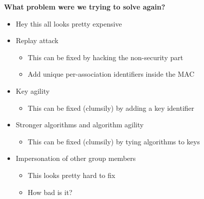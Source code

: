 \documentclass[helvetica]{seminar}
\newcommand{\heading}[1]{%
  \begin{center} 
    \large\bf 
    #1 
  \end{center} 
  \vspace{.4 in}}
\begin{document}
\begin{slide}
\heading{What problem were we trying to solve again?}

\vspace{-.2 in}
\begin{itemize}
\item Hey this all looks pretty expensive
\vspace{.05 in}
\item Replay attack
\begin{itemize}
\item This can be fixed by hacking the non-security part
\item Add unique per-association identifiers inside the MAC
\end{itemize}
\item Key agility
\begin{itemize}
\item This can be fixed (clumsily) by adding a key identifier
\end{itemize}
\item Stronger algorithms and algorithm agility
\begin{itemize}
\item This can be fixed (clumsily) by tying algorithms to keys 
\end{itemize}
\item Impersonation of other group members
\begin{itemize}
\item This looks pretty hard to fix
\item How bad is it?
\end{itemize}
\end{itemize}

\end{slide}
\end{document}
